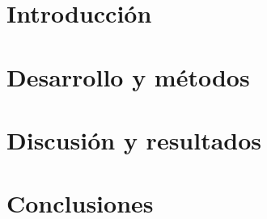 \documentclass[11pt,letterpaper]{article}
\begin{document}
\section{Introducción}\label{sec:introduccion}



\section{Desarrollo y métodos}\label{sec:desarrollo}



\section{Discusión y resultados}\label{sec:resultados}


\section{Conclusiones}\label{sec:conclusiones}



%


\end{document}
